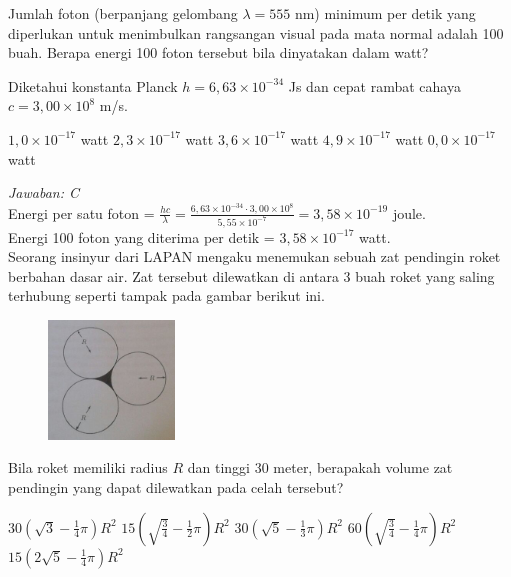 \documentclass[11pt,fleqn]{exam}
\begin{document}
\begin{questions}
\question Jumlah foton (berpanjang gelombang $\lambda=555$ nm) minimum per detik yang diperlukan untuk menimbulkan rangsangan visual pada mata normal adalah 100 buah. Berapa energi 100 foton tersebut bila dinyatakan dalam watt?

\noindent Diketahui konstanta Planck $h=6,63 \times 10^{-34}$ Js dan cepat rambat cahaya $c=3,00\times 10^8$ m/s.
\begin{choices}
\choice $1,0\times 10^{-17}$ watt
\choice $2,3\times 10^{-17}$ watt
\choice $3,6\times 10^{-17}$ watt
\choice $4,9\times 10^{-17}$ watt
\choice $0,0\times 10^{-17}$ watt
\end{choices}

\textit{Jawaban: C}\\
Energi per satu foton = $\frac{hc}{\lambda} = \frac{6,63 \times 10^{-34} \cdot 3,00\times 10^8}{5,55 \times 10^{-7}} = 3,58 \times 10^{-19}$ joule.\\
Energi 100 foton yang diterima per detik = $3,58 \times 10^{-17}$ watt.\\


\question Seorang insinyur dari LAPAN mengaku menemukan sebuah zat pendingin roket berbahan dasar air. Zat tersebut dilewatkan di antara 3 buah roket yang saling terhubung seperti tampak pada gambar berikut ini.
\begin{figure}[H]
\centering
\includegraphics[width=0.3\textwidth]{gambar/pendingin_roket.png}
\end{figure}
\noindent Bila roket memiliki radius $R$ dan tinggi 30 meter, berapakah volume zat pendingin yang dapat dilewatkan pada celah tersebut?
\begin{choices}
\choice $30(\sqrt{3}-\frac{1}{4}\pi)R^2$
\choice $15(\sqrt{\frac{3}{4}}-\frac{1}{2}\pi)R^2$
\choice $30(\sqrt{5}-\frac{1}{3}\pi)R^2$
\choice $60(\sqrt{\frac{3}{4}}-\frac{1}{4}\pi)R^2$
\choice $15(2\sqrt{5}-\frac{1}{4}\pi)R^2$
\end{choices}


\end{questions}
\end{document}
